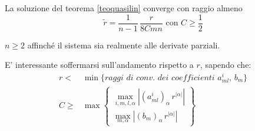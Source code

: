 \begin{theorem}\label{stimaraggio}
La soluzione del teorema \ref{teoquasilin} converge con raggio almeno
$$\widetilde{r} = \dfrac{1}{n-1}\, \dfrac{r}{8Cmn} \text{ con } C \geq \frac{1}{2}$$
\end{theorem}
\begin{remark}
$n \geq 2$ affinché il sistema sia realmente alle derivate parziali. 
\end{remark}
\begin{remark}
E' interessante soffermarsi sull'andamento rispetto a $r$, sapendo che:
\begin{align}\label{r}
r <& \min \{ \textit{raggi di conv. dei coefficienti } a^i_{ml}, \, b_m\} \\
\label{C}
C \geq & \max \begin{Bmatrix}
\max\limits_{i,m,l,\alpha } \left| (a^i_{ml})_\alpha \, r^{|\alpha |}\right|\\
\max\limits_{m,\alpha} \left|(b_m)_\alpha \, r^{|\alpha |}\right|
\end{Bmatrix}
\end{align}
\end{remark}


